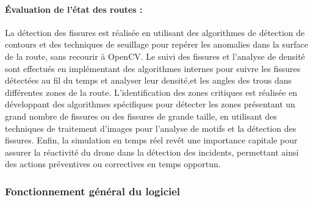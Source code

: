 \paragraph{Évaluation de l'état des routes : } 

La détection des fissures est réalisée en utilisant des algorithmes de détection de contours et des techniques de seuillage pour repérer les anomalies dans la surface de la route, sans recourir à OpenCV.
Le suivi des fissures et l'analyse de densité sont effectués en implémentant des algorithmes internes pour suivre les fissures détectées au fil du temps et analyser leur densité,et les angles des trous dans différentes zones de la route.
L'identification des zones critiques est réalisée en développant des algorithmes spécifiques pour détecter les zones présentant un grand nombre de fissures ou des fissures de grande taille, en utilisant des techniques de traitement d'images pour l'analyse de motifs et la détection des fissures.
Enfin, la simulation en temps réel revêt une importance capitale pour assurer la réactivité du drone dans la détection des incidents, permettant ainsi des actions préventives ou correctives en temps opportun.
\label{sec:spec1}

\subsubsection{Fonctionnement général du logiciel}
